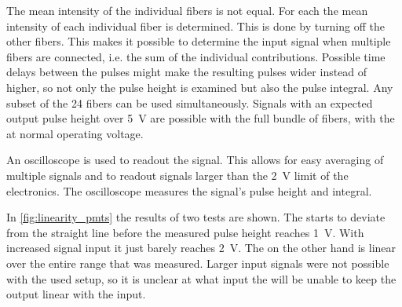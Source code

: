 The mean intensity of the individual fibers is not equal. For each \pmt the mean intensity of each individual fiber is determined. This is done by turning off the other fibers. This makes it possible to determine the input signal when multiple fibers are connected, i.e. the sum of the individual contributions. Possible time delays between the pulses might make the resulting pulses wider instead of higher, so not only the pulse height is examined but also the pulse integral. Any subset of the 24 fibers can be used simultaneously. Signals with an expected \pmt output pulse height over \SI{5}{\volt} are possible with the full bundle of fibers, with the \pmt at normal operating voltage.

An oscilloscope is used to readout the \pmt signal. This allows for easy averaging of multiple signals and to readout signals larger than the \SI{2}{\volt} limit of the \hisparc electronics. The oscilloscope measures the signal's pulse height and integral.

In \cref{fig:linearity_pmts} the results of two \pmt tests are shown. The \senstech \pmt starts to deviate from the straight line before the measured pulse height reaches \SI{1}{\volt}. With increased signal input it just barely reaches \SI{2}{\volt}. The \nikhef \pmt on the other hand is linear over the entire range that was measured. Larger input signals were not possible with the used setup, so it is unclear at what input the \nikhef \pmt will be unable to keep the output linear with the input.

